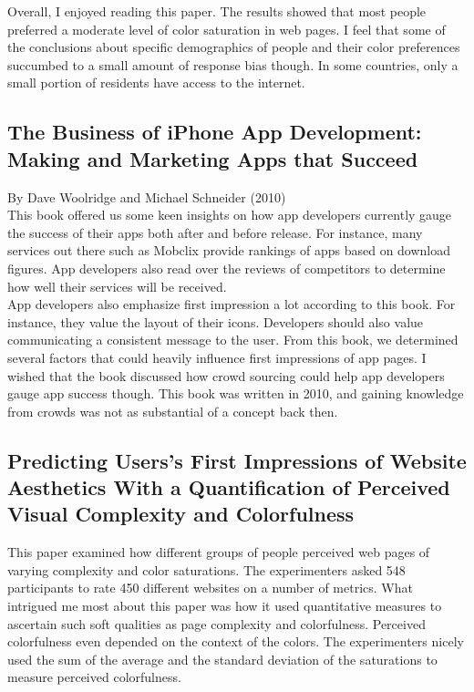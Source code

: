 \documentclass{article}
\begin{document}
Overall, I enjoyed reading this paper. The results showed that most people preferred a moderate level of color saturation in web pages. I feel that some of the conclusions about specific demographics of people and their color preferences succumbed to a small amount of response bias though. In some countries, only a small portion of residents have access to the internet.

\subsection{The Business of iPhone App Development: Making and Marketing Apps that Succeed}

By Dave Woolridge and Michael Schneider (2010) \\

This book offered us some keen insights on how app developers currently gauge the success of their apps both after and before release. For instance, many services out there such as Mobclix provide rankings of apps based on download figures. App developers also read over the reviews of competitors to determine how well their services will be received. \\

App developers also emphasize first impression a lot according to this book. For instance, they value the layout of their icons. Developers should also value communicating a consistent message to the user. From this book, we determined several factors that could heavily influence first impressions of app pages. I wished that the book discussed how crowd sourcing could help app developers gauge app success though. This book was written in 2010, and gaining knowledge from crowds was not as substantial of a concept back then.

\subsection{Predicting Users's First Impressions of Website Aesthetics With a Quantiﬁcation of Perceived Visual Complexity and Colorfulness}

This paper examined how different groups of people perceived web pages of varying complexity and color saturations. The experimenters asked 548 participants to rate 450 different websites on a number of metrics. What intrigued me most about this paper was how it used quantitative measures to ascertain such soft qualities as page complexity and colorfulness. Perceived colorfulness even depended on the context of the colors. The experimenters nicely used the sum of the average and the standard deviation of the saturations to measure perceived colorfulness. \\
\end{document}
